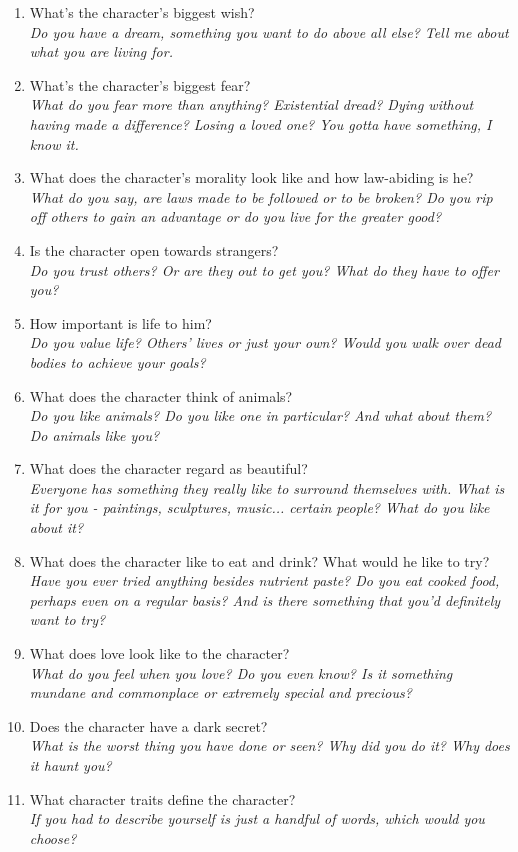 \documentclass[12pt,a4paper,openany,usenames,dvipsnames]{book}
\begin{document}
\begin{enumerate}
		\item What’s the character’s biggest wish?\\
			\textit{Do you have a dream, something you want to do above all else? Tell me about what you are living for.}
		\item What’s the character’s biggest fear?\\
			\textit{What do you fear more than anything? Existential dread? Dying without having made a difference? Losing a loved one? You gotta have something, I know it.}
		\item What does the character’s morality look like and how law-abiding is he?\\
			\textit{What do you say, are laws made to be followed or to be broken? Do you rip off others to gain an advantage or do you live for the greater good?}
		\item Is the character open towards strangers?\\
			\textit{Do you trust others? Or are they out to get you? What do they have to offer you?}
		\item How important is life to him?\\
			\textit{Do you value life?
				Others' lives or just your own?
				Would you walk over dead bodies to achieve your goals?}
		\item What does the character think of animals?\\
			\textit{Do you like animals? Do you like one in particular? And what about them? Do animals like you?}
		\item What does the character regard as beautiful?\\
			\textit{Everyone has something they really like to surround themselves with. What is it for you - paintings, sculptures, music... certain people? What do you like about it?}
		\item What does the character like to eat and drink? What would he like to try?\\
			\textit{Have you ever tried anything besides nutrient paste? Do you eat cooked food, perhaps even on a regular basis? And is there something that you'd definitely want to try?}
		\item What does love look like to the character?\\
			\textit{What do you feel when you love? Do you even know? Is it something mundane and commonplace or extremely special and precious?}
		\item Does the character have a dark secret?\\
			\textit{What is the worst thing you have done or seen? Why did you do it? Why does it haunt you?}
		\item What character traits define the character?\\
			\textit{If you had to describe yourself is just a handful of words, which would you choose?}
	\end{enumerate}
\end{document}

